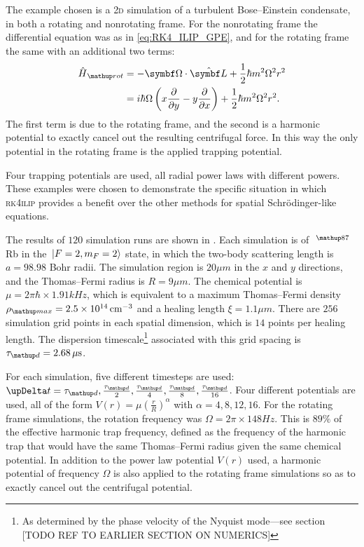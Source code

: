  The example chosen is a \textsc{2d} simulation of a turbulent Bose--Einstein condensate, in both a rotating and nonrotating frame. For the nonrotating frame the differential equation was as in \eqref{eq:RK4_ILIP_GPE}, and for the rotating frame the same with an additional two terms:
\begin{align}
\hat H_\up{rot} &= -\vec \Omega \cdot \hat{\vec L} +\frac12\hbar m^2\Omega^2 r^2\\
                &= i\hbar\Omega \left(x\pdv{y} - y\pdv{x}\right) +\frac12\hbar m^2\Omega^2 r^2.
\end{align}
The first term is due to the rotating frame, and the second is a harmonic potential to exactly cancel out the resulting centrifugal force. In this way the only potential in the rotating frame is the applied trapping potential.

 Four trapping potentials are used, all radial power laws with different powers. These examples were chosen to demonstrate the specific situation in which \textsc{rk4ilip} provides a benefit over the other methods for spatial Schr\"odinger-like equations.

The results of $120$ simulation runs are shown in . Each simulation is of $\ ^\up{87}$Rb in the $\ket{F=2, m_F=2}$ state, in which the two-body scattering length is $a = 98.98$ Bohr radii. The simulation region is $20\unit{\mu m}$ in the $x$ and $y$ directions, and the Thomas--Fermi radius is $R = 9\unit{\mu m}$.  The chemical potential is $\mu = 2\pi\hbar\times 1.91\unit{kHz}$, which is equivalent to a maximum Thomas--Fermi density $\rho_\up{max} = 2.5\E{14}\unit{cm}^{-3}$ and a healing length $\xi = 1.1\unit{\mu m}$. There are $256$ simulation grid points in each spatial dimension, which is $14$ points per healing length. The dispersion timescale\footnote{As determined by the phase velocity of the Nyquist mode---see section [TODO REF TO EARLIER SECTION ON NUMERICS]} associated with this grid spacing is $\tau_\up d = 2.68\unit{\mu s}$.

For each simulation, five different timesteps are used: $\upDelta t = \tau_\up d, \frac {\tau_\up d} 2, \frac {\tau_\up d} 4, \frac {\tau_\up d} 8, \frac {\tau_\up d } {16}$. Four different potentials are used, all of the form $V(r) = \mu \left(\frac r R\right)^\alpha$ with $\alpha = 4, 8, 12, 16$. For the rotating frame simulations, the rotation frequency was $\Omega = 2\pi \times 148\unit{Hz}$. This is $89\%$ of the effective harmonic trap frequency, defined as the frequency of the harmonic trap that would have the same Thomas--Fermi radius given the same chemical potential. In addition to the power law potential $V(r)$ used, a harmonic potential of frequency $\Omega$ is also applied to the rotating frame simulations so as to exactly cancel out the centrifugal potential.

